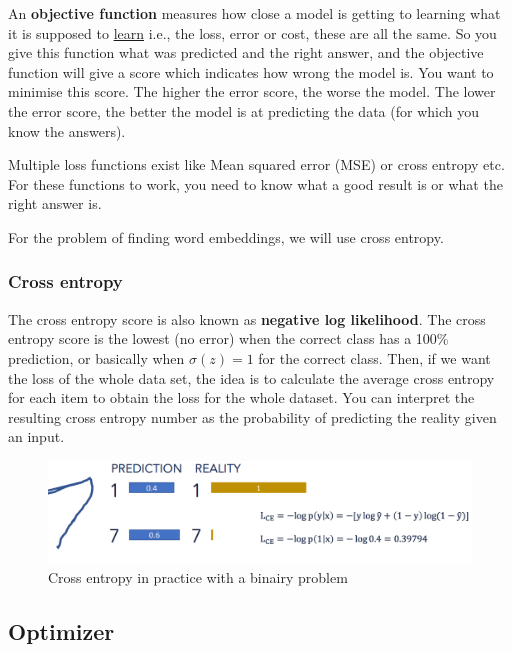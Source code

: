 \documentclass[
  11pt,
  british,
]{article}
\begin{document}
An \textbf{objective function} measures how close a model is getting to
learning what it is supposed to \href{../Other/Learning.md}{learn} i.e.,
the loss, error or cost, these are all the same. So you give this
function what was predicted and the right answer, and the objective
function will give a score which indicates how wrong the model is. You
want to minimise this score. The higher the error score, the worse the
model. The lower the error score, the better the model is at predicting
the data (for which you know the answers).

Multiple loss functions exist like Mean squared error (MSE) or cross
entropy etc. For these functions to work, you need to know what a good
result is or what the right answer is.

For the problem of finding word embeddings, we will use cross entropy.

\hypertarget{cross-entropy}{%
\subsubsection{Cross entropy}\label{cross-entropy}}

The cross entropy score is also known as \textbf{negative log
likelihood}. The cross entropy score is the lowest (no error) when the
correct class has a 100\% prediction, or basically when
\(\sigma(z) = 1\) for the correct class. Then, if we want the loss of
the whole data set, the idea is to calculate the average cross entropy
for each item to obtain the loss for the whole dataset. You can
interpret the resulting cross entropy number as the probability of
predicting the reality given an input.

\begin{figure}
\centering
\includegraphics{Pasted_image_20220603192054.png}
\caption{Cross entropy in practice with a binairy problem}
\end{figure}

\hypertarget{optimizer}{%
\subsection{Optimizer}\label{optimizer}}
\end{document}

